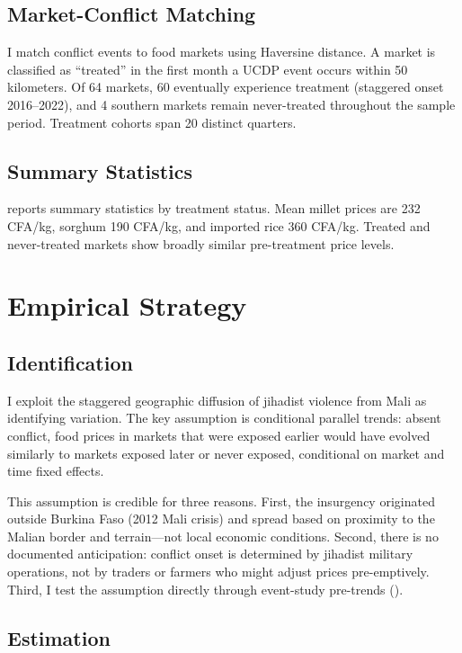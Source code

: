 \documentclass[12pt]{article}
\begin{document}
\subsection{Market-Conflict Matching}

I match conflict events to food markets using Haversine distance. A market is classified as ``treated'' in the first month a UCDP event occurs within 50 kilometers. Of 64 markets, 60 eventually experience treatment (staggered onset 2016--2022), and 4 southern markets remain never-treated throughout the sample period. Treatment cohorts span 20 distinct quarters.

\subsection{Summary Statistics}



 reports summary statistics by treatment status. Mean millet prices are 232 CFA/kg, sorghum 190 CFA/kg, and imported rice 360 CFA/kg. Treated and never-treated markets show broadly similar pre-treatment price levels.


\section{Empirical Strategy}

\subsection{Identification}

I exploit the staggered geographic diffusion of jihadist violence from Mali as identifying variation. The key assumption is conditional parallel trends: absent conflict, food prices in markets that were exposed earlier would have evolved similarly to markets exposed later or never exposed, conditional on market and time fixed effects.

This assumption is credible for three reasons. First, the insurgency originated outside Burkina Faso (2012 Mali crisis) and spread based on proximity to the Malian border and terrain---not local economic conditions. Second, there is no documented anticipation: conflict onset is determined by jihadist military operations, not by traders or farmers who might adjust prices pre-emptively. Third, I test the assumption directly through event-study pre-trends ().

\subsection{Estimation}
\end{document}
